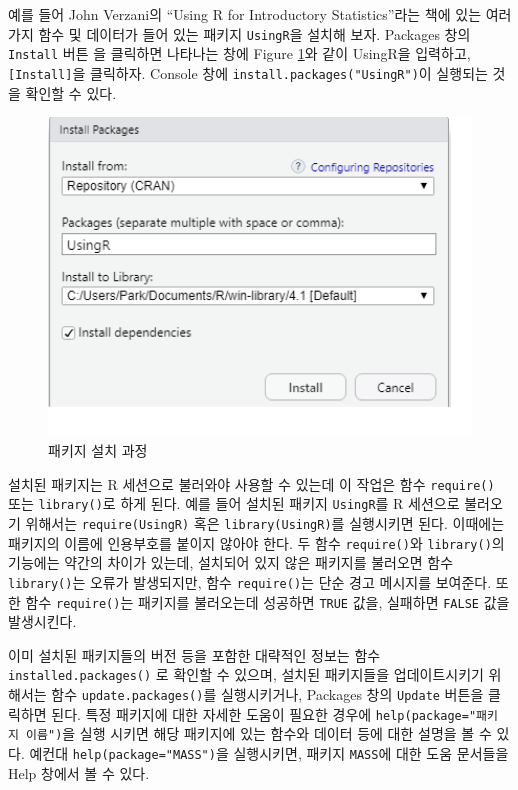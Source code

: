 \documentclass[
]{book}
\begin{document}
예를 들어 John Verzani의 ``Using R for Introductory Statistics''라는 책에
있는 여러 가지 함수 및 데이터가 들어 있는 패키지 \texttt{UsingR}을 설치해 보자.
Packages 창의 \texttt{Install} 버튼 을 클릭하면 나타나는 창에 Figure
\ref{fig:install-package}와 같이 UsingR을 입력하고, \texttt{{[}Install{]}}을
클릭하자. Console 창에 \texttt{install.packages("UsingR")}이 실행되는 것을
확인할 수 있다.

\begin{figure}
\includegraphics[width=5.62in]{Figure/install_package} \caption{패키지 설치 과정}\label{fig:install-package}
\end{figure}

설치된 패키지는 R 세션으로 불러와야 사용할 수 있는데 이 작업은 함수
\texttt{require()} 또는 \texttt{library()}로 하게 된다. 예를 들어 설치된 패키지
\texttt{UsingR}를 R 세션으로 불러오기 위해서는 \texttt{require(UsingR)} 혹은
\texttt{library(UsingR)}를 실행시키면 된다. 이때에는 패키지의 이름에 인용부호를
붙이지 않아야 한다. 두 함수 \texttt{require()}와 \texttt{library()}의 기능에는 약간의
차이가 있는데, 설치되어 있지 않은 패키지를 불러오면 함수 \texttt{library()}는
오류가 발생되지만, 함수 \texttt{require()}는 단순 경고 메시지를 보여준다. 또한
함수 \texttt{require()}는 패키지를 불러오는데 성공하면 \texttt{TRUE} 값을, 실패하면
\texttt{FALSE} 값을 발생시킨다.

이미 설치된 패키지들의 버전 등을 포함한 대략적인 정보는 함수
\texttt{installed.packages()} 로 확인할 수 있으며, 설치된 패키지들을
업데이트시키기 위해서는 함수 \texttt{update.packages()}를 실행시키거나,
Packages 창의 \texttt{Update} 버튼을 클릭하면 된다. 특정 패키지에 대한 자세한
도움이 필요한 경우에 \texttt{help(package="패키지\ 이름")}을 실행 시키면 해당
패키지에 있는 함수와 데이터 등에 대한 설명을 볼 수 있다. 예컨대
\texttt{help(package="MASS")}을 실행시키면, 패키지 \texttt{MASS}에 대한 도움 문서들을
Help 창에서 볼 수 있다.
\end{document}
